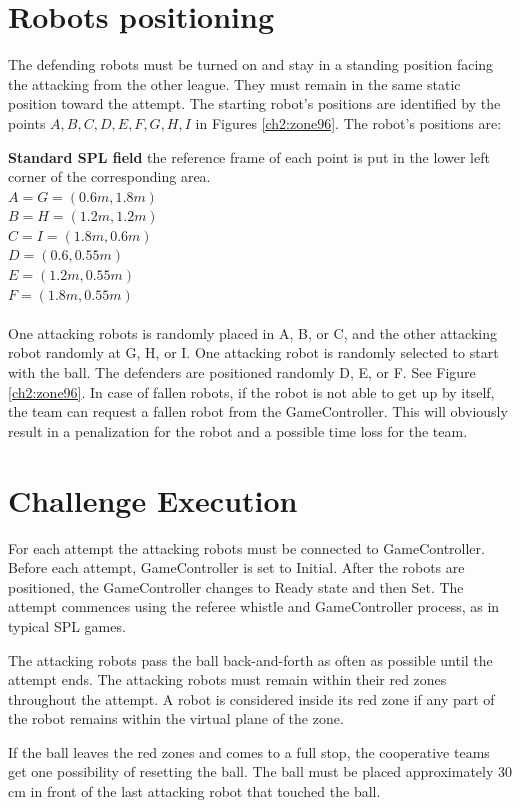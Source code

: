 \documentclass[12pt]{article}
\begin{document}
\section{Robots positioning}
The defending robots must be turned on and stay in a standing position facing the attacking from the other league.
They must remain in the same static position toward the attempt.
The starting robot's positions are identified by the points ${A,B,C,D,E,F,G,H,I}$ in Figures \ref{ch2:zone96}.
The robot's positions are:

\textbf{Standard SPL field} the reference frame of each point is put in the lower left corner of the corresponding area.
\\
$A = G = (0.6m, 1.8m)$
\\
$B = H = (1.2m, 1.2m)$
\\
$C = I = (1.8m, 0.6m)$
\\
$D = (0.6, 0.55m)$
\\
$E = (1.2m, 0.55m)$
\\
$F = (1.8m, 0.55m)$
\\
\\

One attacking robots is randomly placed in A, B, or C, and the other attacking robot randomly at G, H, or I.
One attacking robot is randomly selected to start with the ball.
The defenders are positioned randomly D, E, or F.
See Figure \ref{ch2:zone96}.
In case of fallen robots, if the robot is not able to get up by itself, the team can request a fallen robot from the GameController.
This will obviously result in a penalization for the robot and a possible time loss for the team.

\section{Challenge Execution}
For each attempt the attacking robots must be connected to GameController.
Before each attempt, GameController is set to Initial.
After the robots are positioned, the GameController changes to Ready state and then Set.
The attempt commences using the referee whistle and GameController process, as in typical SPL games.

The attacking robots pass the ball back-and-forth as often as possible until the attempt ends.
The attacking robots must remain within their red zones throughout the attempt.
A robot is considered inside its red zone if any part of the robot remains within the virtual plane of the zone.

If the ball leaves the red zones and comes to a full stop, the cooperative teams get one possibility of resetting the ball.
The ball must be placed approximately 30 cm in front of the last attacking robot that touched the ball.
\end{document}

